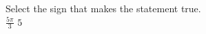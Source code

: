 \documentclass{ximera}
\author{David Kish}
\begin{document}
\begin{exercise}
Select the sign that makes the statement true.\\
$\frac{5\pi}{3}$ \wordChoice{\choice{$<$}\choice[correct]{$>$}\choice{$=$}} $5$ 

\end{exercise}
\end{document}
